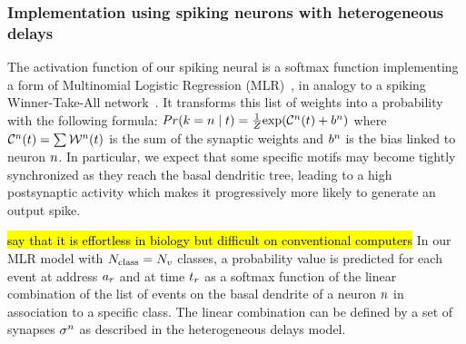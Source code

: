 \documentclass[default]{sn-jnl}%
\theoremstyle{thmstyleone}%
\theoremstyle{thmstyletwo}%
\theoremstyle{thmstylethree}%
\newcommand{\note}[1]{{\sethlcolor{yellow}\hl{#1}}}
\begin{document}
\subsubsection{Implementation using spiking neurons with heterogeneous delays}
%
The activation function of our spiking neural is a softmax function implementing a form of  Multinomial Logistic Regression (MLR)~\citep{grimaldi_robust_2022}, in analogy to a spiking Winner-Take-All network~\citep{nessler_bayesian_2013}. 
It transforms this list of weights into a probability with the following formula:
$
Pr(k=n \; \vert \; t) =
\frac 1 Z
{\exp  (\mathcal{C}^n(t) +b^n) }
$ 
where $\mathcal{C}^n(t) = \sum
\mathcal{W}^n(t)
$ is the sum of the synaptic weights and $b^n$ is the bias linked to neuron $n$. 
In particular, we expect that some specific motifs may become tightly synchronized as they reach the basal dendritic tree, leading to a high postsynaptic activity which makes it progressively more likely to generate an output spike.
%

\note{say that it is effortless in biology but difficult on conventional computers}
In our MLR model with $N_\text{class}=N_v$ classes, a probability value is predicted for each event at address $a_r$ and at time $t_r$ as a softmax function of the linear combination of the list of events on the basal dendrite of a neuron $n$ in association to a specific class. The linear combination can be defined by a set of synapses $\sigma^n$ as described in the heterogeneous delays model. 
%
\end{document}
